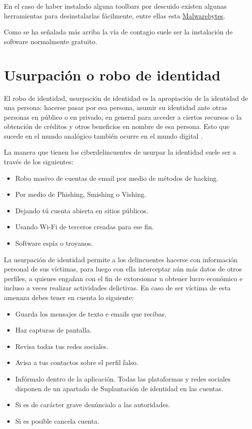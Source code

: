 \documentclass[
  a4paper,
  openany]{book}
\begin{document}
En el caso de haber instalado alguna toolbars por descuido existen algunas herramientas para desinstalarlas fácilmente, entre ellas esta \href{https://es.malwarebytes.com/adwcleaner/}{Malwarebytes}.

Como se ha señalada más arriba la vía de contagio suele ser la instalación de software normalmente gratuito.

\hypertarget{usurpaciuxf3n-o-robo-de-identidad}{%
\section{Usurpación o robo de identidad}\label{usurpaciuxf3n-o-robo-de-identidad}}

El robo de identidad, usurpación de identidad es la apropiación de la identidad de una persona: hacerse pasar por esa persona, asumir su identidad ante otras personas en público o en privado, en general para acceder a ciertos recursos o la obtención de créditos y otros beneficios en nombre de esa persona. Esto que sucede en el mundo analógico también ocurre en el mundo digital \citep{WIKI-usurpacion}.

La manera que tienen los ciberdelincuentes de usurpar la identidad suele ser a través de los siguientes:

\begin{itemize}
\item
  Robo masivo de cuentas de email por medio de métodos de hacking.
\item
  Por medio de Phishing, Smishing o Vishing.
\item
  Dejando tú cuenta abierta en sitios públicos.
\item
  Usando Wi-Fi de terceros creadas para ese fin.
\item
  Software espía o troyanos.
\end{itemize}

La usurpación de identidad permite a los delincuentes hacerse con información personal de sus víctimas, para luego con ella interceptar aún más datos de otros perfiles, a quienes engañan con el fin de extorsionar u obtener lucro económico e incluso a veces realizar actividades delictivas.
En caso de ser víctima de esta amenaza debes tener en cuenta lo siguiente:

\begin{itemize}
\item
  Guarda los mensajes de texto e emails que recibas.
\item
  Haz capturas de pantalla.
\item
  Revisa todas tus redes sociales.
\item
  Avisa a tus contactos sobre el perfil falso.
\item
  Infórmalo dentro de la aplicación. Todas las plataformas y redes sociales disponen de un apartado de Suplantación de identidad en las cuentas.
\item
  Si es de carácter grave denúncialo a las autoridades.
\item
  Si es posible cancela cuenta.
\end{itemize}
\end{document}
